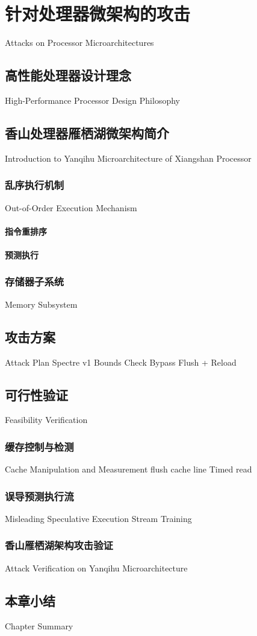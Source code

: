 
\chapter{针对处理器微架构的攻击}{Attacks on Processor Microarchitectures}


\section{高性能处理器设计理念}{High-Performance Processor Design Philosophy}
\somewords


\section{香山处理器雁栖湖微架构简介}{Introduction to Yanqihu Microarchitecture of Xiangshan Processor}
\somewords
\subsection{乱序执行机制}{Out-of-Order Execution Mechanism}
\somewords
\subsubsection{指令重排序}
\somewords
\subsubsection{预测执行}
\somewords
\subsection{存储器子系统}{Memory Subsystem}
\somewords


\section{攻击方案}{Attack Plan}
Spectre v1 Bounds Check Bypass
Flush + Reload
\somewords


\section{可行性验证}{Feasibility Verification}
\somewords
\subsection{缓存控制与检测}{Cache Manipulation and Measurement}
flush cache line
Timed read
\subsection{误导预测执行流}{Misleading Speculative Execution Stream}
Training
\subsection{香山雁栖湖架构攻击验证}{Attack Verification on Yanqihu Microarchitecture}
\somewords


\section{本章小结}{Chapter Summary}
\somewords


\newpage
